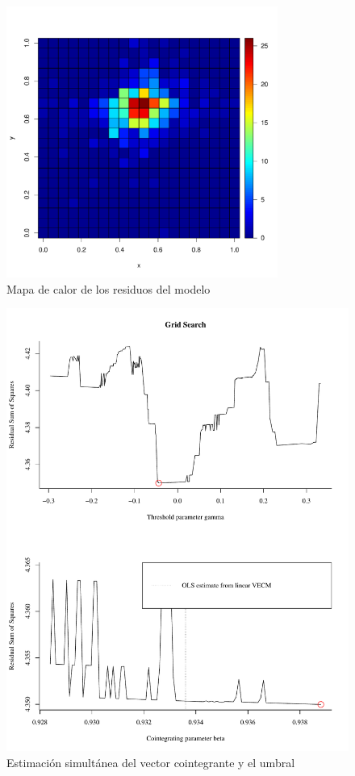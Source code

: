 \documentclass[12pt, twoside]{book}\usepackage[]{graphicx}\usepackage[]{color}
\newenvironment{knitrout}{}{} %
\numberwithin{equation}{section}
\numberwithin{theorem}{section}
\numberwithin{teorema}{section}
\numberwithin{defi}{section}
\numberwithin{prop}{section}
\numberwithin{defi}{section}
\theoremstyle{plain}
\begin{document}
\begin{knitrout}
\color{fgcolor}\begin{figure}[H]

{\centering \includegraphics[width=3.5in,height=3.5in]{figure/fig-5_3_2-1} 

}

\caption[Mapa de calor de los residuos del modelo]{Mapa de calor de los residuos del modelo}\label{fig:fig-5.3.2}
\end{figure}


\end{knitrout}




\begin{figure}
\includegraphics[scale=0.6]{figure/grid_search.pdf}
\caption{Estimación simultánea del vector cointegrante y el umbral}
\end{figure}
\end{document}
